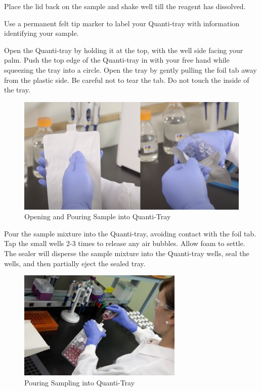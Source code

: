 \documentclass[12pt]{../SOP4_alpha}\usepackage[]{graphicx}\usepackage[]{xcolor}
\begin{document}
\NP Place the lid back on the sample and shake well till the reagent has dissolved.

\NP Use a permanent felt tip marker to label your Quanti-tray with information identifying your sample. 

\NP Open the Quanti-tray by holding it at the top, with the well side facing your palm. Push the top edge of the Quanti-tray in with your free hand while squeezing the tray into a circle. Open the tray by gently pulling the foil tab away from the plastic side. Be careful not to tear the tab. Do not touch the inside of the tray. 

\begin{figure}
\includegraphics[width=1\textwidth]{figures/OpeningQuanti-Tray.png}
\caption{Opening and Pouring Sample into Quanti-Tray}
\label{fig:Adding Reagent}
\end{figure}

\clearpage

\NP Pour the sample mixture into the Quanti-tray, avoiding contact with the foil tab. Tap the small wells 2-3 times to release any air bubbles. Allow foam to settle. The sealer will disperse the sample mixture into the Quanti-tray wells, seal the wells, and then partially eject the sealed tray.

\begin{figure}
\includegraphics[width=0.7\textwidth]{figures/Step2.jpg}
\caption{Pouring Sampling into Quanti-Tray}
\end{figure}
\end{document}
